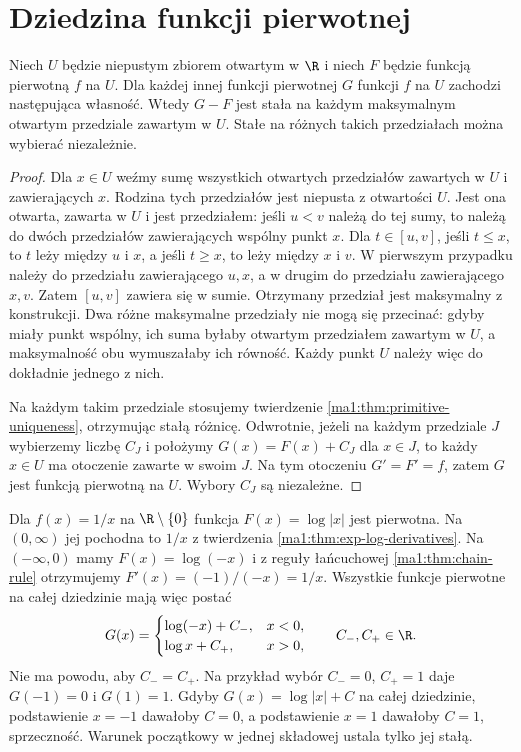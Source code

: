 \section{Dziedzina funkcji pierwotnej}
\begin{stwierdzenie}
\label{ma1:prop:primitive-components}
Niech $U$ będzie niepustym zbiorem otwartym w $\R$ i niech $F$ będzie funkcją pierwotną $f$ na $U$. Dla każdej innej funkcji pierwotnej $G$ funkcji $f$ na $U$ zachodzi następująca własność. Wtedy $G-F$ jest stała na każdym maksymalnym otwartym przedziale zawartym w $U$. Stałe na różnych takich przedziałach można wybierać niezależnie.
\end{stwierdzenie}
\begin{proof}
Dla $x\in U$ weźmy sumę wszystkich otwartych przedziałów zawartych w $U$ i zawierających $x$. Rodzina tych przedziałów jest niepusta z otwartości $U$. Jest ona otwarta, zawarta w $U$ i jest przedziałem: jeśli $u<v$ należą do tej sumy, to należą do dwóch przedziałów zawierających wspólny punkt $x$. Dla $t\in[u,v]$, jeśli $t\le x$, to $t$ leży między $u$ i $x$, a jeśli $t\ge x$, to leży między $x$ i $v$. W pierwszym przypadku należy do przedziału zawierającego $u,x$, a w drugim do przedziału zawierającego $x,v$. Zatem $[u,v]$ zawiera się w sumie. Otrzymany przedział jest maksymalny z konstrukcji. Dwa różne maksymalne przedziały nie mogą się przecinać: gdyby miały punkt wspólny, ich suma byłaby otwartym przedziałem zawartym w $U$, a maksymalność obu wymuszałaby ich równość. Każdy punkt $U$ należy więc do dokładnie jednego z nich.

Na każdym takim przedziale stosujemy twierdzenie \ref{ma1:thm:primitive-uniqueness}, otrzymując stałą różnicę. Odwrotnie, jeżeli na każdym przedziale $J$ wybierzemy liczbę $C_J$ i położymy $G(x)=F(x)+C_J$ dla $x\in J$, to każdy $x\in U$ ma otoczenie zawarte w swoim $J$. Na tym otoczeniu $G'=F'=f$, zatem $G$ jest funkcją pierwotną na $U$. Wybory $C_J$ są niezależne.
\end{proof}

\begin{przyklad}
\label{ma1:ex:primitive-log-domain}
Dla $f(x)=1/x$ na $\R\setminus\{0\}$ funkcja $F(x)=\log|x|$ jest pierwotna. Na $(0,\infty)$ jej pochodna to $1/x$ z twierdzenia \ref{ma1:thm:exp-log-derivatives}. Na $(-\infty,0)$ mamy $F(x)=\log(-x)$ i z reguły łańcuchowej \ref{ma1:thm:chain-rule} otrzymujemy $F'(x)=(-1)/(-x)=1/x$. Wszystkie funkcje pierwotne na całej dziedzinie mają więc postać
\[
 G(x)=
 \begin{cases}
 \log(-x)+C_-,&x<0,\\
 \log x+C_+,&x>0,
 \end{cases}
 \qquad C_-,C_+\in\R.
\]
Nie ma powodu, aby $C_-=C_+$. Na przykład wybór $C_-=0$, $C_+=1$ daje $G(-1)=0$ i $G(1)=1$. Gdyby $G(x)=\log|x|+C$ na całej dziedzinie, podstawienie $x=-1$ dawałoby $C=0$, a podstawienie $x=1$ dawałoby $C=1$, sprzeczność. Warunek początkowy w jednej składowej ustala tylko jej stałą.
\end{przyklad}

